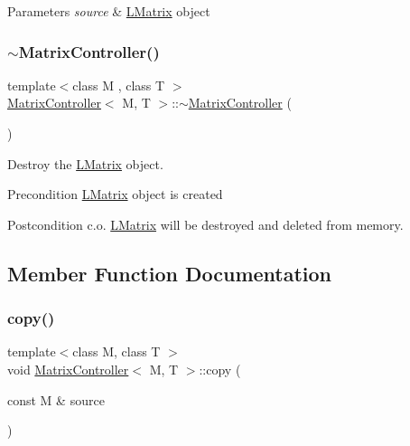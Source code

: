 \begin{DoxyParams}{Parameters}
{\em source} & \mbox{\hyperlink{class_l_matrix}{L\+Matrix}} object \\
\hline
\end{DoxyParams}
\mbox{\label{class_matrix_controller_ac3e8818bb538155c6cb7a46a9ec92ece}} 
\subsubsection{\texorpdfstring{$\sim$MatrixController()}{~MatrixController()}}
{\footnotesize\ttfamily template$<$class M , class T $>$ \\
\mbox{\hyperlink{class_matrix_controller}{Matrix\+Controller}}$<$ M, T $>$\+::$\sim$\mbox{\hyperlink{class_matrix_controller}{Matrix\+Controller}} (\begin{DoxyParamCaption}{ }\end{DoxyParamCaption})}



Destroy the \mbox{\hyperlink{class_l_matrix}{L\+Matrix}} object. 

\begin{DoxyPrecond}{Precondition}
\mbox{\hyperlink{class_l_matrix}{L\+Matrix}} object is created 
\end{DoxyPrecond}
\begin{DoxyPostcond}{Postcondition}
c.\+o. \mbox{\hyperlink{class_l_matrix}{L\+Matrix}} will be destroyed and deleted from memory. 
\end{DoxyPostcond}


\subsection{Member Function Documentation}
\mbox{\label{class_matrix_controller_aced34d0065a5df3d3fadb140a782a22b}} 
\subsubsection{\texorpdfstring{copy()}{copy()}}
{\footnotesize\ttfamily template$<$class M, class T $>$ \\
void \mbox{\hyperlink{class_matrix_controller}{Matrix\+Controller}}$<$ M, T $>$\+::copy (\begin{DoxyParamCaption}\item[{const M \&}]{source }\end{DoxyParamCaption})}



